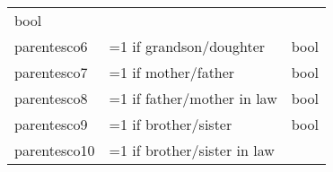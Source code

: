 \documentclass[11pt]{article}
\begin{document}
\begin{longtable}[]{@{}lll@{}}
\begin{minipage}[t]{0.24\columnwidth}
bool\strut
\end{minipage}\tabularnewline
\begin{minipage}[t]{0.19\columnwidth}\raggedright\strut
parentesco6\strut
\end{minipage} & \begin{minipage}[t]{0.16\columnwidth}\raggedright\strut
=1 if grandson/doughter\strut
\end{minipage} & \begin{minipage}[t]{0.24\columnwidth}\raggedright\strut
bool\strut
\end{minipage}\tabularnewline
\begin{minipage}[t]{0.19\columnwidth}\raggedright\strut
parentesco7\strut
\end{minipage} & \begin{minipage}[t]{0.16\columnwidth}\raggedright\strut
=1 if mother/father\strut
\end{minipage} & \begin{minipage}[t]{0.24\columnwidth}\raggedright\strut
bool\strut
\end{minipage}\tabularnewline
\begin{minipage}[t]{0.19\columnwidth}\raggedright\strut
parentesco8\strut
\end{minipage} & \begin{minipage}[t]{0.16\columnwidth}\raggedright\strut
=1 if father/mother in law\strut
\end{minipage} & \begin{minipage}[t]{0.24\columnwidth}\raggedright\strut
bool\strut
\end{minipage}\tabularnewline
\begin{minipage}[t]{0.19\columnwidth}\raggedright\strut
parentesco9\strut
\end{minipage} & \begin{minipage}[t]{0.16\columnwidth}\raggedright\strut
=1 if brother/sister\strut
\end{minipage} & \begin{minipage}[t]{0.24\columnwidth}\raggedright\strut
bool\strut
\end{minipage}\tabularnewline
\begin{minipage}[t]{0.19\columnwidth}\raggedright\strut
parentesco10\strut
\end{minipage} & \begin{minipage}[t]{0.16\columnwidth}\raggedright\strut
=1 if brother/sister in law\strut
\end{minipage} & \begin{minipage}[t]{0.24\columnwidth}\raggedright\strut

\end{minipage}
\end{longtable}
\end{document}
